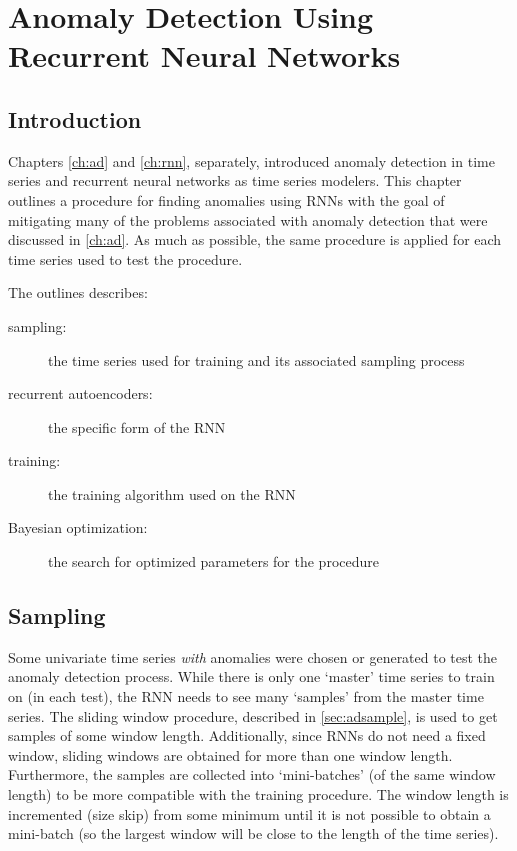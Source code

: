 \chapter[]{Anomaly Detection Using Recurrent Neural Networks}


\section{Introduction}

Chapters \ref{ch:ad} and \ref{ch:rnn}, separately, introduced anomaly detection in time series and recurrent neural networks as time series modelers.
%
This chapter outlines a procedure for finding anomalies using RNNs with the goal of mitigating many of the problems associated with anomaly detection that were discussed in \ref{ch:ad}.
%
As much as possible, the same procedure is applied for each time series used to test the procedure.


The outlines describes:
%
\begin{description}
%
\item[sampling:] the time series used for training and its associated sampling process
%
\item[recurrent autoencoders:] the specific form of the RNN
%
\item[training:] the training algorithm used on the RNN
%
\item[Bayesian optimization:] the search for optimized parameters for the procedure
%
\end{description}



\section{Sampling}


Some univariate time series \emph{with} anomalies were chosen or generated to test the anomaly detection process.
%
While there is only one `master' time series to train on (in each test), the RNN needs to see many `samples' from the master time series.
%
The sliding window procedure, described in \ref{sec:adsample}, is used to get samples of some window length.
%
Additionally, since RNNs do not need a fixed window, sliding windows are obtained for more than one window length.
%
Furthermore, the samples are collected into `mini-batches' (of the same window length) to be more compatible with the training procedure.
%
The window length is incremented (size skip) from some minimum until it is not possible to obtain a mini-batch (so the largest window will be close to the length of the time series).


